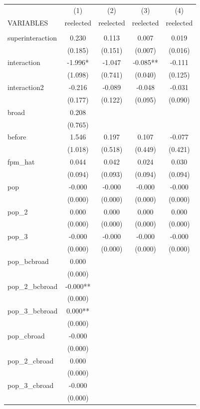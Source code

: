 \documentclass[]{article}
\begin{document}
\begin{tabular}{lcccc} \hline
 & (1) & (2) & (3) & (4) \\
VARIABLES & reelected & reelected & reelected & reelected \\ \hline
 &  &  &  &  \\
superinteraction & 0.230 & 0.113 & 0.007 & 0.019 \\
 & (0.185) & (0.151) & (0.007) & (0.016) \\
interaction & -1.996* & -1.047 & -0.085** & -0.111 \\
 & (1.098) & (0.741) & (0.040) & (0.125) \\
interaction2 & -0.216 & -0.089 & -0.048 & -0.031 \\
 & (0.177) & (0.122) & (0.095) & (0.090) \\
broad & 0.208 &  &  &  \\
 & (0.765) &  &  &  \\
before & 1.546 & 0.197 & 0.107 & -0.077 \\
 & (1.018) & (0.518) & (0.449) & (0.421) \\
fpm\_hat & 0.044 & 0.042 & 0.024 & 0.030 \\
 & (0.094) & (0.093) & (0.094) & (0.094) \\
pop & -0.000 & -0.000 & -0.000 & -0.000 \\
 & (0.000) & (0.000) & (0.000) & (0.000) \\
pop\_2 & 0.000 & 0.000 & 0.000 & 0.000 \\
 & (0.000) & (0.000) & (0.000) & (0.000) \\
pop\_3 & -0.000 & -0.000 & -0.000 & -0.000 \\
 & (0.000) & (0.000) & (0.000) & (0.000) \\
pop\_bcbroad & 0.000 &  &  &  \\
 & (0.000) &  &  &  \\
pop\_2\_bcbroad & -0.000** &  &  &  \\
 & (0.000) &  &  &  \\
pop\_3\_bcbroad & 0.000** &  &  &  \\
 & (0.000) &  &  &  \\
pop\_cbroad & -0.000 &  &  &  \\
 & (0.000) &  &  &  \\
pop\_2\_cbroad & 0.000 &  &  &  \\
 & (0.000) &  &  &  \\
pop\_3\_cbroad & -0.000 &  &  &  \\
 & (0.000) &  &  &  \\

\end{tabular}
\end{document}
